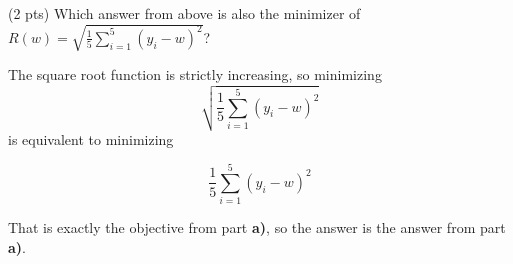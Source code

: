 \documentclass[11pt]{article}
\begin{document}
\begin{prob}
\begin{subprob}(2 pts)
Which answer from above is also the minimizer of $\displaystyle R(w) = \sqrt{\frac{1}{5} \sum_{i=1}^5 (y_i - w)^2}$? \\

   
\begin{solution}
The square root function is strictly increasing, so minimizing
\[
\sqrt{\frac{1}{5} \sum_{i=1}^5 (y_i-w)^2}
\]
is equivalent to minimizing

$$\frac{1}{5} \sum_{i=1}^5 (y_i-w)^2$$

That is exactly the objective from part \textbf{a)}, so the answer is the answer from part \textbf{a)}.
\end{solution}
\end{subprob}


\end{prob}
\end{document}
